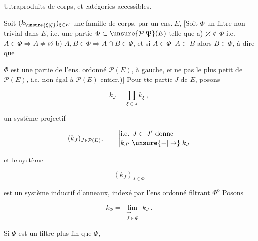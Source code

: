 


Ultraproduits de corps, et catégories accessibles.

Soit $(k_{\unsure{\xi|\zeta}})_{\xi\in E}$ une famille de corps,  par un ens. $E$,  [Soit $\Phi$ un filtre non trivial dans $E$, i.e. une partie $\Phi\subset\unsure{\mathcal P|\mathfrak P}(E)$ telle que  a) $\varnothing\notin\Phi$ i.e. $A\in\Phi\Longrightarrow A\ne\varnothing$ b) $A,B\in\Phi\Longrightarrow A\cap B\in\Phi$, et  si $A\in\Phi$, $A\subset B$ alors $B\in\Phi$,   à dire que

$\Phi$ est une partie  de l'ens. ordonné $\mathcal P(E)$, \uline{ à gauche}, et ne  pas le plus petit  de $\mathcal P(E)$, i.e. non égal à $\mathcal P(E)$  entier.)] Pour tte partie $J$ de $E$, posons

\[
k_J=\prod_{\xi\in J}k_\xi\ ,
\]

     un système projectif 

\[
(k_J)_{J\in\mathcal P(E)},\qquad
\left|\begin{aligned}&\text{i.e. }J\subset J'\ \text{donne}\\[-2pt]
&k_{J'}\mathrel{\unsure{-|\to}} k_J
\end{aligned}\right.
\]

et  le système

\[
(k_J)_{J\in\Phi}
\]

est un système inductif d'anneaux, indexé par l'ens ordonné filtrant $\Phi^{\mathrm o}$\unsure{:|;} Posons

\[
k_\Phi=\underset{\substack{\longrightarrow\\J\in\Phi}}{\lim}k_J\ .
\]

Si $\Psi$ est un filtre plus fin que $\Phi$, 

